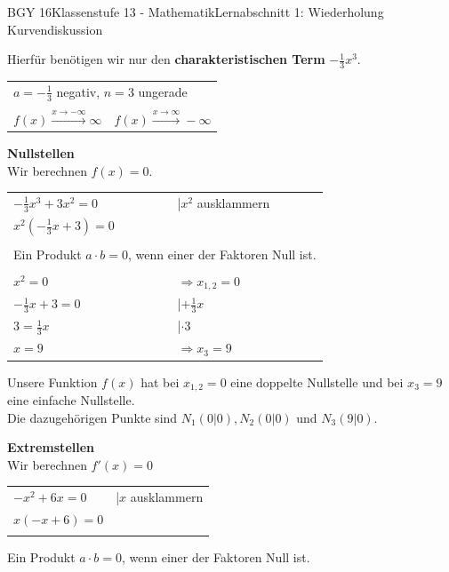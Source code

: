 \documentclass[oneside,openany,headings=optiontotoc,11pt,numbers=noenddot]{scrreprt}
\begin{document}
\begin{worksheet}{BGY 16}{Klassenstufe 13 - Mathematik}{Lernabschnitt 1: Wiederholung Kurvendiskussion}
\begin{framed}
			Hierfür benötigen wir nur den \textbf{charakteristischen Term} \(-\frac{1}{3}x^3\).\\
			\begin{tabularx}{\textwidth}{XX}
				\multicolumn{2}{l}{\(a = -\frac{1}{3}\) negativ, \(n = 3\) ungerade}\\
				\\
				\(f(x)\xrightarrow{x\rightarrow-\infty}\infty\) & \(f(x)\xrightarrow{x\rightarrow\infty}-\infty\)
			\end{tabularx}
			\textbf{Nullstellen}\\
			Wir berechnen \(f(x) = 0\).\\
			\par
			\begin{tabularx}{\textwidth}{ll}
				\(-\frac{1}{3}x^3 +3x^2 = 0\) & |\(x^2\) ausklammern\\
				\(x^2(-\frac{1}{3}x +3) = 0\)\\
				\\
				\multicolumn{2}{l}{Ein Produkt \(a\cdot{}b = 0\), wenn einer der Faktoren Null ist.}\\
				\\
				\(x^2 = 0\) & \(\Rightarrow x_{1,2} = 0\)\\
				\(-\frac{1}{3}x + 3 = 0\) & |\(+\frac{1}{3}x\)\\
				\(3 = \frac{1}{3}x\) & |\(\cdot{}3\)\\
				\(x = 9\) & \(\Rightarrow x_3 = 9\)
			\end{tabularx}
			Unsere Funktion \(f(x)\) hat bei \colorbox{green!10}{\(x_{1,2}=0\)} eine doppelte Nullstelle und bei \colorbox{green!10}{\(x_3 = 9\)} eine einfache Nullstelle.\\
			Die dazugehörigen Punkte sind \underline{\(N_1 (0|0), N_2(0|0)\)} und \underline{\(N_3(9|0)\)}.\\
			\par\noindent
			\textbf{Extremstellen}\\
			Wir berechnen \(f'(x) = 0\)\\
			\begin{tabularx}{\textwidth}{ll}
				\(-x^2+6x = 0\) & |\(x\) ausklammern\\
				\(x(-x+6) = 0\)\\
				\\
			\end{tabularx}
			Ein Produkt \(a\cdot{}b = 0\), wenn einer der Faktoren Null ist.\\
			\begin{tabularx}{\textwidth}{ll}

\end{tabularx}
\end{framed}
\end{worksheet}
\end{document}
